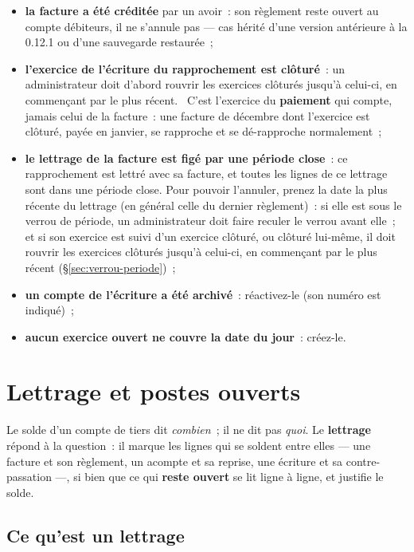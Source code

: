 \documentclass[a4paper,11pt,oneside]{article}
\begin{document}
\begin{itemize}
    \item \textbf{la facture a été créditée} par un avoir~: son règlement reste ouvert au
          compte débiteurs, il ne s'annule pas --- cas hérité d'une version antérieure à la 0.12.1
          ou d'une sauvegarde restaurée~;
    \item \textbf{l'exercice de l'écriture du rapprochement est clôturé}~: un administrateur
          doit d'abord rouvrir les exercices clôturés jusqu'à celui-ci, en commençant par le
          plus récent. \keshAttention\ C'est l'exercice du \textbf{paiement} qui compte, jamais
          celui de la facture~: une facture de décembre dont l'exercice est clôturé, payée en
          janvier, se rapproche et se dé-rapproche normalement~;
    \item \textbf{le lettrage de la facture est figé par une période close}~: ce rapprochement
          est lettré avec sa facture, et toutes les lignes de ce lettrage sont dans une période
          close. Pour pouvoir l'annuler, prenez la date la plus récente du lettrage (en général
          celle du dernier règlement)~: si elle est sous le verrou de période, un administrateur
          doit faire reculer le verrou avant elle~; et si son exercice est suivi d'un exercice
          clôturé, ou clôturé lui-même, il doit rouvrir les exercices clôturés jusqu'à
          celui-ci, en commençant par le plus récent (\S\ref{sec:verrou-periode})~;
    \item \textbf{un compte de l'écriture a été archivé}~: réactivez-le (son numéro est
          indiqué)~;
    \item \textbf{aucun exercice ouvert ne couvre la date du jour}~: créez-le.
\end{itemize}

\section{Lettrage et postes ouverts}\label{sec:lettrage}

Le solde d'un compte de tiers dit \emph{combien}~; il ne dit pas \emph{quoi}. Le
\textbf{lettrage} répond à la question~: il marque les lignes qui se soldent entre elles ---
une facture et son règlement, un acompte et sa reprise, une écriture et sa contre-passation
---, si bien que ce qui \textbf{reste ouvert} se lit ligne à ligne, et justifie le solde.

\subsection{Ce qu'est un lettrage}
\end{document}
